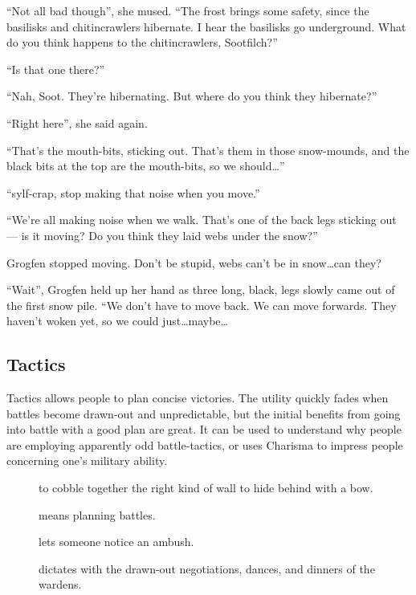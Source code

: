 \begin{multicols}{2}
\begin{exampletext}
  ``Not all bad though'', she mused.
  ``The frost brings some safety, since the basilisks and chitincrawlers hibernate.
  I hear the basilisks go underground.
  What do you think happens to the chitincrawlers, Sootfilch?''

  ``Is that one there?''

  ``Nah, Soot.
  They're hibernating.
  But where do you think they hibernate?''

  ``Right here'', she said again.
  {\small
    ``That's the mouth-bits, sticking out.
    That's them in those snow-mounds, and the black bits at the top are the mouth-bits, so we should\ldots''

    ``\Gls{sylf}-crap, stop making that noise when you move.''
  }{\footnotesize
    ``We're all making noise when we walk.
    That's one of the back legs sticking out --- is it moving?
    Do you think they laid webs under the snow?''

    Grogfen stopped moving.
    Don't be stupid, webs can't be in snow\ldots can they?
  }{\scriptsize
    ``Wait'',
    Grogfen held up her hand as three long, black, legs slowly came out of the first snow pile.
    ``We don't have to move back.
    We can move forwards.
    They haven't woken yet, so we could just\ldots maybe\ldots
  }

\end{exampletext}

\subsection{Tactics}

Tactics allows people to plan concise victories.
The utility quickly fades when battles become drawn-out and unpredictable, but the initial benefits from going into battle with a good plan are great.
It can be used to understand why people are employing apparently odd battle-tactics, or uses Charisma to impress people concerning one's military ability.

\begin{description}
  \item[]
    to cobble together the right kind of wall to hide behind with a bow.
  \item[]
    means planning battles.
  \item[]
    lets someone notice an ambush.
  \item[]
    dictates with the drawn-out negotiations, dances, and dinners of the wardens.
\end{description}


\end{multicols}
